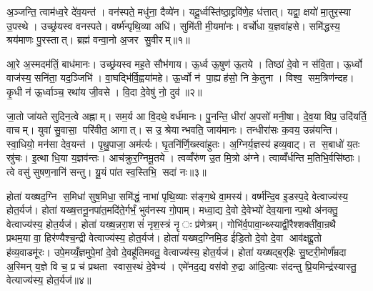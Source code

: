 \clearpage
{}
\setcounter{anuvakam}{0}
अ॒ञ्जन्ति॒ त्वाम॑ध्व॒रे दे॑व॒यन्त॑। वन॑स्पते॒ मधु॑ना॒ दैव्ये॑न। यदू॒र्ध्वस्ति॑ष्ठा॒द्द्रवि॑णे॒ह ध॑त्तात्। यद्वा॒ क्षयो॑ मा॒तुर॒स्या उ॒पस्थे। उच्छ्र॑यस्व वनस्पते। वर्ष्म॑न्पृथि॒व्या अधि॑। सुमि॑ती मी॒यमा॑नः। वर्चो॑धा य॒ज्ञवा॑हसे। समि॑द्धस्य॒ श्रय॑माणः पु॒रस्तात्। ब्रह्म॑ वन्वा॒नो अ॒जर सु॒वीरम्॥१॥

आ॒रे अ॒स्मदम॑तिं॒ बाध॑मानः। उच्छ्र॑यस्व मह॒ते सौभ॑गाय। ऊ॒र्ध्व ऊ॒षुण॑ ऊ॒तये। तिष्ठा॑ दे॒वो न स॑वि॒ता। ऊ॒र्ध्वो वाज॑स्य॒ सनि॑ता॒ यद॒ञ्जिभि॑। वा॒घद्भि॑र्वि॒ह्वया॑महे। ऊ॒र्ध्वो न॑ पा॒ह्यह॑सो॒ नि के॒तुना। विश्व॒ सम॒त्रिण॑न्दह। कृ॒धी न॑ ऊ॒र्ध्वाञ्च॒ रथा॑य जी॒वसे। वि॒दा दे॒वेषु॑ नो॒ दुव॑॥२॥

जा॒तो जा॑यते सुदिन॒त्वे अह्नाम्। सम॒र्य आ वि॒दथे॒ वर्ध॑मानः। पु॒नन्ति॒ धीरा॑ अ॒पसो॑ मनी॒षा। दे॒व॒या विप्र॒ उदि॑यर्ति॒ वाचम्। युवा॑ सु॒वासा॒ परि॑वीत॒ आगात्। स उ॒ श्रेयान्भवति॒ जाय॑मानः। तन्धीरा॑सः क॒वय॒ उन्न॑यन्ति। स्वा॒धियो॒ मन॑सा देव॒यन्त॑। पृ॒थु॒पाजा॒ अम॑र्त्यः। घृ॒तनि॑र्णि॒ख्स्वा॑हुतः। अ॒ग्निर्य॒ज्ञस्य॑ हव्य॒वाट्। त स॒बाधो॑ य॒तः स्रु॑चः। इ॒त्था धि॒या य॒ज्ञव॑न्तः। आच॑क्रुर॒ग्निमू॒तये। त्वव्वँरु॑ण उ॒त मि॒त्रो अ॑ग्ने। त्वाव्वँ॑र्धन्ति म॒तिभि॒र्वसि॑ष्ठाः। त्वे वसु॑ सुषण॒नानि॑ सन्तु। यू॒यं पा॑त स्व॒स्तिभि॒ सदा॑ नः॥३॥\anuvakamend[सु॒वीर॒न्दुव॒ स्वा॑हुतो॒ऽष्टौ च॑]

होता॑ यख्षद॒ग्नि स॒मिधा॑ सुष॒मिधा॒ समि॑द्धं॒ नाभा॑ पृथि॒व्याः स॑ङ्ग॒थे वा॒मस्य॑। वर्ष्म॑न्दि॒व इ॒डस्प॒दे वेत्वाज्य॑स्य॒ होत॒र्यज॑। होता॑ यख्ष॒त्तनू॒नपा॑त॒मदि॑ते॒र्गर्भं॒ भुव॑नस्य गो॒पाम्। मध्वा॒द्य दे॒वो दे॒वेभ्यो॑ देव॒यानान्प॒थो अ॑नक्तु॒ वेत्वाज्य॑स्य॒ होत॒र्यज॑। होता॑ यख्ष॒न्नरा॒शसं॑ नृश॒स्त्रं नॄः प्र॑णेत्रम्। गोभि॑र्व॒पावा॒न्थ्स्याद्वी॒रैश्शक्ती॑वा॒न्रथै प्रथम॒या वा॒ हिर॑ण्यैश्च॒न्द्री वेत्वाज्य॑स्य॒ होत॒र्यज॑। होता॑ यख्षद॒ग्निमि॒ड ई॑डि॒तो दे॒वो दे॒वा आव॑क्षद्दू॒तो ह॑व्य॒वाडमू॑रः। उपे॒मय्यँ॒ज्ञमुपे॒मां दे॒वो दे॒वहू॑तिमवतु॒ वेत्वाज्य॑स्य॒ होत॒र्यज॑। होता॑ यख्षद्ब॒र्‌हिः सु॒ष्टरी॒मोर्णं॑म्रदा अ॒स्मिन् य॒ज्ञे वि च॒ प्र च॑ प्रथता स्वास॒स्थं दे॒वेभ्य॑। एमे॑नद॒द्य वस॑वो रु॒द्रा आ॑दि॒त्याः स॑दन्तु प्रि॒यमिन्द्र॑स्यास्तु॒ वेत्याज्य॑स्य॒ होत॒र्यज॑॥४॥

